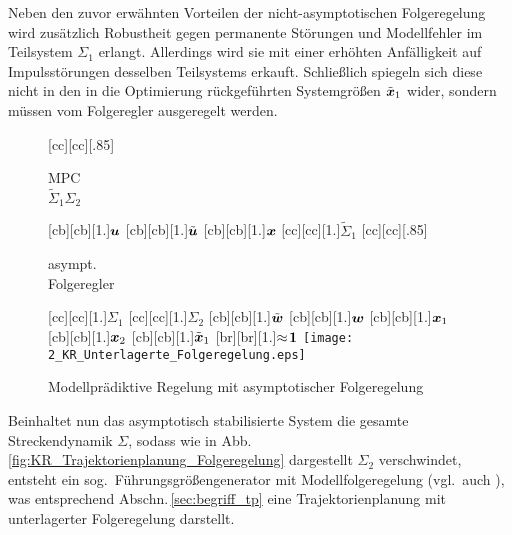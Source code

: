 Neben den zuvor erwähnten Vorteilen der nicht-asymptotischen Folgeregelung wird zusätzlich Robustheit gegen permanente Störungen und Modellfehler im Teilsystem $\Sigma_1$ erlangt. Allerdings wird sie mit einer erhöhten Anfälligkeit auf Impulsstörungen desselben Teilsystems erkauft.
Schließlich spiegeln sich diese nicht in den in die Optimierung rückgeführten Systemgrößen $\tilde {\boldsymbol{x}}_1$ wider, sondern müssen %
vom Folgeregler ausgeregelt werden.
%
\begin{figure}[h]
\centering
\newcommand{\smallsize}{.85}
			[cc][cc][\smallsize]{\parbox[c]{7cm}{\begin{center}MPC\\ $\tilde\Sigma_1 \Sigma_2$ \end{center}}}
		[cb][cb][1.]{$\boldsymbol{u}$}
		[cb][cb][1.]{$\tilde{\boldsymbol{u}}$}
		[cb][cb][1.]{$\boldsymbol{x}$}
		[cc][cc][1.]{$\tilde \Sigma_1$}
		[cc][cc][\smallsize]{\parbox[c]{7cm}{\begin{center}asympt.\ \\ Folgeregler  \end{center}}}
		[cc][cc][1.]{$\Sigma_1$}
		[cc][cc][1.]{$\Sigma_2$}
		[cb][cb][1.]{$\tilde{\boldsymbol{w}}$}
		[cb][cb][1.]{$\boldsymbol{w}$}
		[cb][cb][1.]{$\boldsymbol{x}_1$}
		[cb][cb][1.]{$\boldsymbol{x}_2$}
		[cb][cb][1.]{$\tilde {\boldsymbol{x}}_1$}
		[br][br][1.]{$\approx\!\boldsymbol{1}$}
	\texttt{[image: 2\_KR\_Unterlagerte\_Folgeregelung.eps]}
	\caption{Modellprädiktive Regelung mit asymptotischer Folgeregelung}
	\label{fig:KR_Unterlagerte_Folgeregelung}
\end{figure}

Beinhaltet nun das asymptotisch stabilisierte System die gesamte Streckendynamik $\Sigma$, sodass wie in Abb.\,\ref{fig:KR_Trajektorienplanung_Folgeregelung} dargestellt  $\Sigma_2$ verschwindet, entsteht ein sog.\ Führungsgrößengenerator mit Modellfolgeregelung (vgl.\ auch \cite{roppenecker2009zustandsregelung}), was entsprechend Abschn.\,\ref{sec:begriff_tp} eine Trajektorienplanung mit unterlagerter Folgeregelung darstellt.

